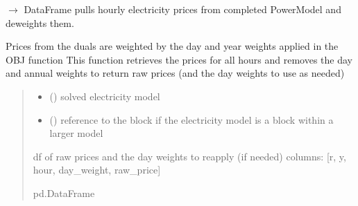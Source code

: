 \documentclass[letterpaper,10pt,english]{sphinxmanual}
\begin{document}
\begin{fulllineitems}
\label{\detokenize{src.integrator.utilities:src.integrator.utilities.get_elec_price}}
\pysigstartsignatures
\pysiglinewithargsret
{}
{\sphinxparamcomma {}}
{{ $\rightarrow$ DataFrame}}
\pysigstopsignatures
\sphinxAtStartPar
pulls hourly electricity prices from completed PowerModel and de\sphinxhyphen{}weights them.

\sphinxAtStartPar
Prices from the duals are weighted by the day and year weights applied in the OBJ function
This function retrieves the prices for all hours and removes the day and annual weights to
return raw prices (and the day weights to use as needed)
\begin{quote}\begin{description}
\begin{itemize}
\item {} 
\sphinxAtStartPar
{} ({\hyperref[\detokenize{src.models.electricity.scripts.electricity_model:src.models.electricity.scripts.electricity_model.PowerModel}]{}}) \textendash{} solved electricity model

\item {} 
\sphinxAtStartPar
{} () \textendash{} reference to the block if the electricity model is a block within a larger model

\end{itemize}

\sphinxAtStartPar
df of raw prices and the day weights to re\sphinxhyphen{}apply (if needed)
columns: {[}r, y, hour, day\_weight, raw\_price{]}

\sphinxAtStartPar
pd.DataFrame

\end{description}\end{quote}

\end{fulllineitems}
\end{document}
